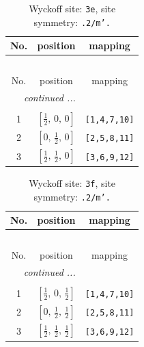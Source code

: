 \documentclass[fleqn,8pt]{jsarticle}
\begin{document}
\begin{longtable}{ccc}
\caption{Wyckoff site: {\tt 3e}, site symmetry: {\tt .2/m'.}}
 \\
 \hline \hline
No. & position & mapping \\ \hline \endfirsthead

\multicolumn{2}{l}{\tablename\ \thetable{}} \\
 \hline \hline
No. & position & mapping \\ \hline \endhead

 \hline \hline
\multicolumn{2}{r}{\footnotesize\it continued ...} \\ \endfoot

 \hline \hline
\multicolumn{2}{r}{} \\ \endlastfoot

1 & $\left[ \frac{1}{2},\, 0,\, 0 \right]$ & {\tt [1,4,7,10]} \\ \hline
2 & $\left[ 0,\, \frac{1}{2},\, 0 \right]$ & {\tt [2,5,8,11]} \\ \hline
3 & $\left[ \frac{1}{2},\, \frac{1}{2},\, 0 \right]$ & {\tt [3,6,9,12]} \\
\end{longtable}
\renewcommand{\arraystretch}{1.2}
\begin{longtable}{ccc}
\caption{Wyckoff site: {\tt 3f}, site symmetry: {\tt .2/m'.}}
 \\
 \hline \hline
No. & position & mapping \\ \hline \endfirsthead

\multicolumn{2}{l}{\tablename\ \thetable{}} \\
 \hline \hline
No. & position & mapping \\ \hline \endhead

 \hline \hline
\multicolumn{2}{r}{\footnotesize\it continued ...} \\ \endfoot

 \hline \hline
\multicolumn{2}{r}{} \\ \endlastfoot

1 & $\left[ \frac{1}{2},\, 0,\, \frac{1}{2} \right]$ & {\tt [1,4,7,10]} \\ \hline
2 & $\left[ 0,\, \frac{1}{2},\, \frac{1}{2} \right]$ & {\tt [2,5,8,11]} \\ \hline
3 & $\left[ \frac{1}{2},\, \frac{1}{2},\, \frac{1}{2} \right]$ & {\tt [3,6,9,12]} \\
\end{longtable}
\renewcommand{\arraystretch}{1.2}
\end{document}
